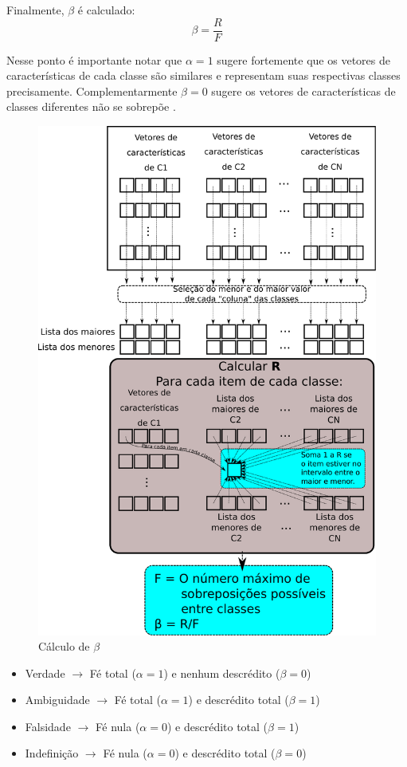 \documentclass[a4paper,12pt,openright,oneside]{book}
\newenvironment{myenv}[1]
  {\begin{spacing}{#1}}
  {\end{spacing}}
\begin{document}
\begin{myenv}{1.5}
						\par Finalmente, $\beta$ é calculado:
						\begin{equation}
							\beta=\dfrac{R}{F}
						\end{equation}
					
						\par Nesse ponto é importante notar que $\alpha=1$ sugere fortemente que os vetores de características de cada classe são similares e representam suas respectivas classes precisamente. Complementarmente $\beta=0$ sugere os vetores de características de classes diferentes não se sobrepõe \cite{8588433}.
						
						\begin{figure}[h]
							\centering
							\includegraphics[width=0.55\linewidth]{images/betaCalculation.pdf}
							\caption{Cálculo de $\beta$}
							\label{fig:betacalculation}
						\end{figure}
						
						
						\begin{itemize}
							\item Verdade $\rightarrow$ Fé total ($\alpha = 1$) e nenhum descrédito ($\beta = 0$)
							\item Ambiguidade $\rightarrow$ Fé total ($\alpha = 1$) e descrédito total ($\beta = 1$)
							\item Falsidade $\rightarrow$ Fé nula ($\alpha = 0$) e descrédito total ($\beta = 1$)
							\item Indefinição $\rightarrow$ Fé nula ($\alpha = 0$) e descrédito total ($\beta = 0$)
						\end{itemize}
						

\end{myenv}
\end{document}
